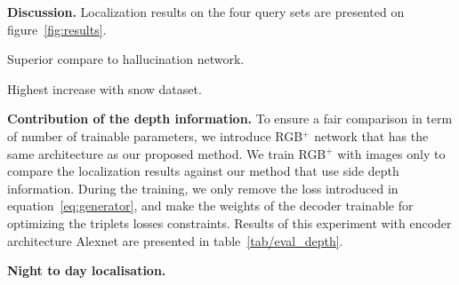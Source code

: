 \noindent\textbf{Discussion.} Localization results on the four query sets are presented on figure~\ref{fig:results}. 

Superior compare to hallucination network.

Highest increase with snow dataset.


\noindent\textbf{Contribution of the depth information.} To ensure a fair comparison in term of number of trainable parameters, we introduce RGB$^+$ network that has the same architecture as our proposed method. We train RGB$^+$ with images only to compare the localization results against our method that use side depth information. During the training, we only remove the loss introduced in equation~\ref{eq:generator}, and make the weights of the decoder trainable for optimizing the triplets losses constraints. Results of this experiment with encoder architecture Alexnet are presented in table~\ref{tab/eval_depth}.

\noindent\textbf{Night to day localisation.}